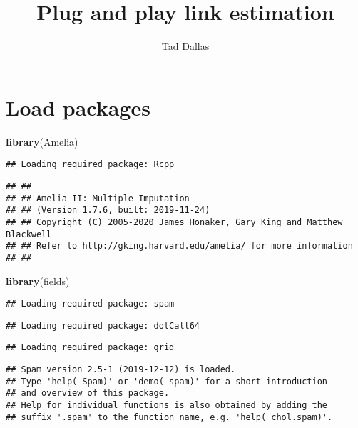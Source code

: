 \documentclass[
]{article}
\title{Plug and play link estimation}
\author{Tad Dallas}
\date{}
\newenvironment{Shaded}{\begin{snugshade}}{\end{snugshade}}
\newcommand{\KeywordTok}[1]{\textcolor[rgb]{0.13,0.29,0.53}{\textbf{#1}}}
\newcommand{\NormalTok}[1]{#1}
\begin{document}
\maketitle

{
\setcounter{tocdepth}{2}
\tableofcontents
}
\hypertarget{load-packages}{%
\section{Load packages}\label{load-packages}}

\begin{Shaded}
\begin{Highlighting}[]
\KeywordTok{library}\NormalTok{(Amelia)}
\end{Highlighting}
\end{Shaded}

\begin{verbatim}
## Loading required package: Rcpp
\end{verbatim}

\begin{verbatim}
## ## 
## ## Amelia II: Multiple Imputation
## ## (Version 1.7.6, built: 2019-11-24)
## ## Copyright (C) 2005-2020 James Honaker, Gary King and Matthew Blackwell
## ## Refer to http://gking.harvard.edu/amelia/ for more information
## ##
\end{verbatim}

\begin{Shaded}
\begin{Highlighting}[]
\KeywordTok{library}\NormalTok{(fields)}
\end{Highlighting}
\end{Shaded}

\begin{verbatim}
## Loading required package: spam
\end{verbatim}

\begin{verbatim}
## Loading required package: dotCall64
\end{verbatim}

\begin{verbatim}
## Loading required package: grid
\end{verbatim}

\begin{verbatim}
## Spam version 2.5-1 (2019-12-12) is loaded.
## Type 'help( Spam)' or 'demo( spam)' for a short introduction 
## and overview of this package.
## Help for individual functions is also obtained by adding the
## suffix '.spam' to the function name, e.g. 'help( chol.spam)'.
\end{verbatim}
\end{document}
